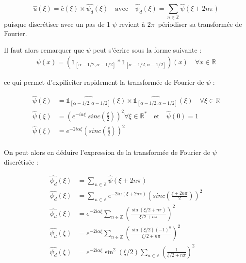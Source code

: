 \documentclass[12pt,a4paper,onecolumn]{article}
\begin{document}
\begin{equation*}
	\widehat{u}(\xi) = \widehat{c}(\xi) \times \widehat{\psi_d}(\xi) \quad \text{avec} \quad \widehat{\psi_d}(\xi) = \sum_{n \in \mathbb{Z}}\widehat{\psi}(\xi + 2n\pi)
\end{equation*}
puisque discrétiser avec un pas de 1 \(\psi\) revient à \(2\pi\)~périodiser sa transformée de Fourier.

Il faut alors remarquer que \(\psi\) peut s'écrire sous la forme suivante :
\begin{equation*}
	\begin{aligned}
		\psi(x) = \left(\mathds{1}_{[\alpha - 1/2, \alpha - 1/2]} * \mathds{1}_{[\alpha - 1/2, \alpha - 1/2]}\right)(x) \quad \forall x \in \mathbb{R}
	\end{aligned}
\end{equation*}

ce qui permet d'expiliciter rapidement la transformée de Fourier de \(\psi\) :

\begin{equation*}
	\begin{aligned}
		\widehat{\psi}(\xi) & = \widehat{\mathds{1}_{[\alpha - 1/2, \alpha - 1/2]}}(\xi) \times \widehat{\mathds{1}_{[\alpha - 1/2, \alpha - 1/2]}}(\xi) \quad \forall \xi \in \mathbb{R} \\
		\widehat{\psi}(\xi) & = \left(e^{-i\alpha\xi}~sinc\left(\frac{\xi}{2}\right)\right)^2           \forall \xi \in \mathbb{R}^* \quad \text{et} \quad \widehat{\psi}(0) = 1          \\
		\widehat{\psi}(\xi) & = e^{-2i\alpha\xi}\left(sinc\left(\frac{\xi}{2}\right)\right)^2                                                                                             \\
	\end{aligned}
\end{equation*}

On peut alors en déduire l'expression de la transformée de Fourier de \(\psi\) discrétisée :

\begin{equation*}
	\begin{aligned}
		\widehat{\psi_d}(\xi) & = \sum_{n \in \mathbb{Z}}\widehat{\psi}(\xi + 2n\pi)                                                     \\
		\widehat{\psi_d}(\xi) & = \sum_{n \in \mathbb{Z}}e^{-2i\alpha(\xi + 2n\pi)}\left(sinc\left(\frac{\xi + 2n\pi}{2}\right)\right)^2 \\
		\widehat{\psi_d}(\xi) & = e^{-2i\alpha\xi}\sum_{n \in \mathbb{Z}}\left(\frac{\sin(\xi / 2 + n\pi)}{\xi / 2 + n\pi}\right)^2      \\
		\widehat{\psi_d}(\xi) & = e^{-2i\alpha\xi}\sum_{n \in \mathbb{Z}}\left(\frac{\sin(\xi / 2)(-1)^n}{\xi / 2 + n\pi}\right)^2       \\
		\widehat{\psi_d}(\xi) & = e^{-2i\alpha\xi}\sin^2(\xi / 2)\sum_{n \in \mathbb{Z}}\left(\frac{1}{\xi / 2 + n\pi}\right)^2          \\
	\end{aligned}
\end{equation*}
\end{document}

